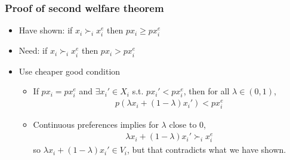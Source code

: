 \documentclass[compress]{beamer}
\newcommand{\pref}{\succ}
\begin{document}
\begin{frame}
  \frametitle{Proof of second welfare theorem}
  \begin{itemize}
  \item Have shown: if $x_i \pref_i x_i^e$ then  $p x_i \geq p x_i^e$
  \item Need: if $x_i \pref_i x_i^e$ then  $p x_i > p x_i^e$
  \item Use cheaper good condition
    \begin{itemize}
    \item If $p x_i = p x_i^e$ and $\exists x_i' \in X_i$ s.t. $p x_i'
      < p x_i^e$, then for all $\lambda \in (0,1)$,
      \begin{align}
        p(\lambda x_i +(1-\lambda) x_i') < p x_i^e
      \end{align}
    \item Continuous preferences implies for $\lambda$ close to $0$, 
      \begin{align}
        \lambda x_i + (1-\lambda)x_i' \pref_i x_i^e      
      \end{align}
      so $\lambda x_i + (1-\lambda) x_i' \in V_i$, but that
      contradicts what we have shown.
    \end{itemize}
  \end{itemize}
\end{frame}
\end{document}
